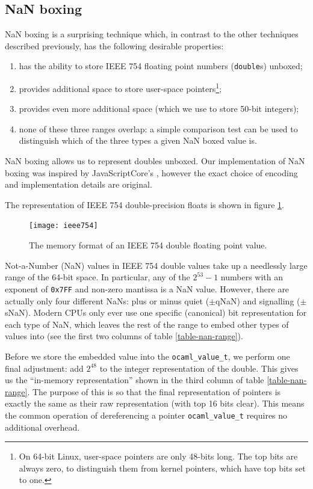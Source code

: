 \documentclass[12pt,a4paper,twoside,openright]{report}
\begin{document}
\subsection{NaN boxing}\label{nan-boxing}

NaN boxing is a surprising technique which, in contrast to the other
techniques described previously, has the following desirable properties:
\begin{enumerate}
    \item has the ability to store IEEE 754 floating point numbers (\lstinline!double!s) unboxed;
    \item provides additional space to store user-space pointers\footnote{On 64-bit
      Linux, user-space pointers are only 48-bits long. The top bits are always
      zero, to distinguish them from kernel pointers, which have top bits set to
      one.};
    \item provides even more additional space (which we use to store 50-bit integers);
    \item none of these three ranges overlap: a simple comparison test can be
      used to distinguish which of the three types a given NaN boxed value is.
\end{enumerate}

NaN boxing allows us to represent doubles unboxed. Our implementation of NaN
boxing was inspired by JavaScriptCore's \cite{jscore}, however the exact choice
of encoding and implementation details are original.

The representation of IEEE 754 double-precision floats is shown in figure \ref{fig-ieee754}.
\begin{figure}[h]
  \centering
  \texttt{[image: ieee754]}
  \caption{The memory format of an IEEE 754 double floating point value.}
  \label{fig-ieee754}
\end{figure}

Not-a-Number (NaN) values in IEEE 754 double values take
up a needlessly large range of the 64-bit space. In
particular, any of the $2^{53}-1$ numbers with an exponent of \texttt{0x7FF} and
non-zero mantissa is a NaN value. However, there are actually only four
different NaNs: plus or minus quiet ($\pm$qNaN) and signalling ($\pm$sNaN).
Modern CPUs only ever use one specific (canonical) bit representation for each
type of NaN, which leaves the rest of the range to embed other types of values
into (see the first two columns of table \ref{table-nan-range}).

Before we store the embedded value into the \lstinline!ocaml_value_t!, we perform
one final adjustment: add $2^{48}$ to the integer representation of the double. This
gives us the ``in-memory representation'' shown in the third column of table
\ref{table-nan-range}. The purpose of this is so that the final representation
of pointers is exactly the same as their raw representation (with top 16 bits clear).
This means the common operation of dereferencing a pointer \lstinline!ocaml_value_t!
requires no additional overhead.
\end{document}
